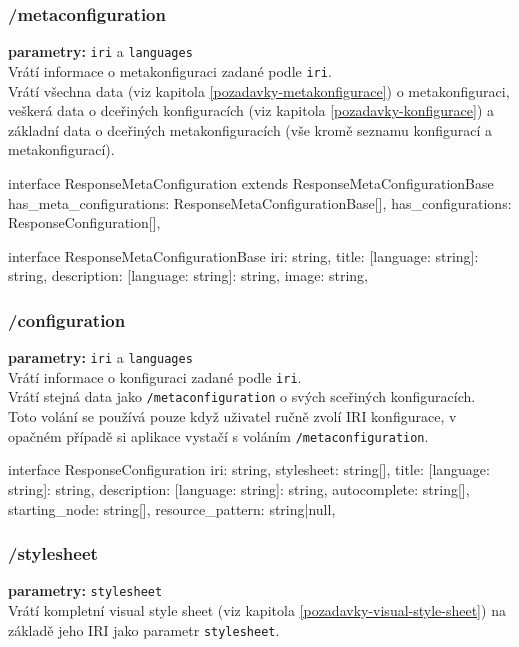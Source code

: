 \subsubsection{/metaconfiguration}
\textbf{parametry:} \texttt{iri} a \texttt{languages} \\
Vrátí informace o metakonfiguraci zadané podle \texttt{iri}. \\
Vrátí všechna data (viz kapitola \ref{pozadavky-metakonfigurace}) o metakonfiguraci, veškerá data o dceřiných konfiguracích (viz kapitola \ref{pozadavky-konfigurace}) a základní data o dceřiných metakonfiguracích (vše kromě seznamu konfigurací a metakonfigurací).

\begin{code}
interface ResponseMetaConfiguration extends
ResponseMetaConfigurationBase {
    has_meta_configurations: ResponseMetaConfigurationBase[],
    has_configurations: ResponseConfiguration[],
}

interface ResponseMetaConfigurationBase {
    iri: string,
    title: {[language: string]: string},
    description: {[language: string]: string},
    image: string,
}
\end{code}

\subsubsection{/configuration}
\textbf{parametry:} \texttt{iri} a \texttt{languages} \\
Vrátí informace o konfiguraci zadané podle \texttt{iri}. \\
Vrátí stejná data jako \texttt{/metaconfiguration} o svých sceřiných konfiguracích. \\
Toto volání se používá pouze když uživatel ručně zvolí IRI konfigurace, v opačném případě si aplikace vystačí s voláním \texttt{/metaconfiguration}.

\begin{code}
interface ResponseConfiguration {
    iri: string,
    stylesheet: string[],
    title: {[language: string]: string},
    description: {[language: string]: string},
    autocomplete: string[],
    starting_node: string[],
    resource_pattern: string|null,
}
\end{code}

\subsubsection{/stylesheet}
\textbf{parametry:} \texttt{stylesheet} \\
Vrátí kompletní visual style sheet (viz kapitola \ref{pozadavky-visual-style-sheet}) na základě jeho IRI jako parametr \texttt{stylesheet}.

